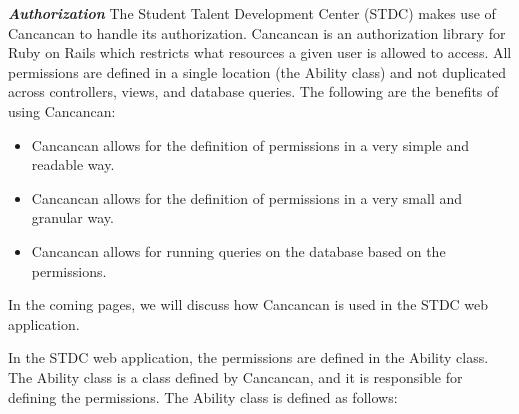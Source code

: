 \begin{justify}
    \clearpage




    \vspace{0.25cm}
    \newendline \textbf{\textit{Authorization}}\newendline
        The Student Talent Development Center (STDC) makes use of Cancancan to handle its authorization. Cancancan is an authorization library for Ruby on Rails which restricts what resources a given user is allowed to access. All permissions are defined in a single location (the Ability class) and not duplicated across controllers, views, and database queries. The following are the benefits of using Cancancan:

        \begin{itemize}
            \item Cancancan allows for the definition of permissions in a very simple and readable way.
            \item Cancancan allows for the definition of permissions in a very small and granular way.
            \item Cancancan allows for running queries on the database based on the permissions.
        \end{itemize}

        \vspace{0.25cm}
        \newendline In the coming pages, we will discuss how Cancancan is used in the STDC web application.

        \vspace{0.25cm}
        \newendline In the STDC web application, the permissions are defined in the Ability class. The Ability class is a class defined by Cancancan, and it is responsible for defining the permissions. The Ability class is defined as follows:


        


\end{justify}
